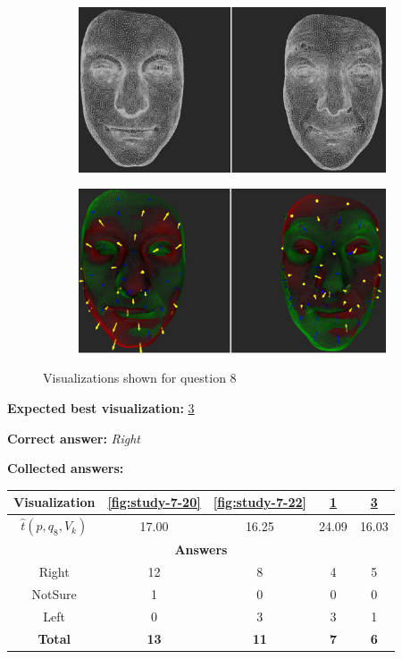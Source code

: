\begin{figure}[h]
\begin{subfigure}{0.49\textwidth}
\includegraphics[width=\textwidth]{./screenshots/pair19.PNG}
\caption{}
\label{fig:study-7-19}
\end{subfigure}
\begin{subfigure}{0.49\textwidth}
\includegraphics[width=\textwidth]{./screenshots/pair21.PNG}
\caption{}
\label{fig:study-7-21}
\end{subfigure}
\caption{Visualizations shown for question 8}
\end{figure}
\medskip

{\bf Expected best visualization:} \ref{fig:study-7-21}
\medskip

{\bf Correct answer:} {\it Right}
\medskip

{\bf Collected answers:}

\begin{center}
\begin{tabular}{| c | c | c | c | c |}
	\hline
	Visualization & \ref{fig:study-7-20} & \ref{fig:study-7-22} & \ref{fig:study-7-19} & \ref{fig:study-7-21}\\ \hline
	\(\widehat{t}(p, q_8, V_k)\) & 17.00 & 16.25 & 24.09 & 16.03\\ \hline
	\multicolumn{5}{|c|}{\bf Answers} \\ \hline
	\rowcolor{yellow!30} Right & 12 & 8 & 4 & 5\\ \hline
	NotSure & 1 & 0 & 0 & 0\\ \hline
	Left & 0 & 3 & 3 & 1\\ \hline
	{\bf Total} & {\bf 13} & {\bf 11} & {\bf 7} & {\bf 6}\\ \hline
\end{tabular}
\end{center}
\clearpage

